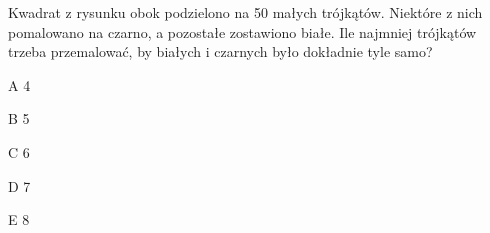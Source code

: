 \begin{tresc}
Kwadrat z rysunku obok podzielono na 50 małych trójkątów. Niektóre z nich pomalowano na czarno, a pozostałe zostawiono białe. Ile najmniej trójkątów trzeba przemalować, by białych i czarnych było dokładnie tyle samo?
\end{tresc}
\begin{wariant}{A} 4 \end{wariant}
\begin{wariant}{B} 5 \end{wariant}
\begin{wariant}{C} 6 \end{wariant}
\begin{wariant}{D} 7 \end{wariant}
\begin{wariant}{E} 8 \end{wariant}
